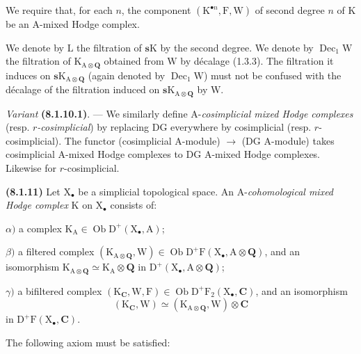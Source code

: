 \documentclass[11pt,leqno]{article}
\begin{document}
We require that, for each \(n\), the component \((\mathrm{K}^{\bullet n},\mathrm{F},\mathrm{W})\) of second degree \(n\) of \(\mathrm{K}\) be an \(\mathrm{A}\)-mixed Hodge complex.

We denote by \(\mathrm{L}\) the filtration of \(\mathbf{s}\mathrm{K}\) by the second degree. We denote by \(\operatorname{Dec}_{1}\mathrm{W}\) the filtration of \(\mathrm{K}_{\mathrm{A}\otimes\mathbf{Q}}\) obtained from \(\mathrm{W}\) by décalage (1.3.3). The filtration it induces on \(\mathbf{s}\mathrm{K}_{\mathrm{A}\otimes\mathbf{Q}}\) (again denoted by \(\operatorname{Dec}_{1}\mathrm{W}\)) must not be confused with the décalage of the filtration induced on \(\mathbf{s}\mathrm{K}_{\mathrm{A}\otimes\mathbf{Q}}\) by \(\mathrm{W}\).

\textit{Variant} \textbf{(8.1.10.1)}. — We similarly define \(\mathrm{A}\)-\textit{cosimplicial mixed Hodge complexes} (resp. \textit{\(r\)-cosimplicial}) by replacing \(\mathrm{DG}\) everywhere by cosimplicial (resp. \(r\)-cosimplicial). The functor (cosimplicial \(\mathrm{A}\)-module) \(\to\) (\(\mathrm{DG}\) \(\mathrm{A}\)-module) takes cosimplicial \(\mathrm{A}\)-mixed Hodge complexes to \(\mathrm{DG}\) \(\mathrm{A}\)-mixed Hodge complexes. Likewise for \(r\)-cosimplicial.

\textbf{(8.1.11)} Let \(\mathrm{X}_{\bullet}\) be a simplicial topological space. An \(\mathrm{A}\)-\textit{cohomological mixed Hodge complex} \(\mathrm{K}\) on \(\mathrm{X}_{\bullet}\) consists of:

\(\alpha)\) a complex \(\mathrm{K}_{\mathrm{A}}\in\operatorname{Ob}\mathrm{D}^{+}(\mathrm{X}_{\bullet},\mathrm{A})\);

\(\beta)\) a filtered complex \((\mathrm{K}_{\mathrm{A}\otimes\mathbf{Q}},\mathrm{W})\in\operatorname{Ob}\mathrm{D}^{+}\mathrm{F}(\mathrm{X}_{\bullet},\mathrm{A}\otimes\mathbf{Q})\), and an isomorphism \(\mathrm{K}_{\mathrm{A}\otimes\mathbf{Q}}\simeq\mathrm{K}_{\mathrm{A}}\otimes\mathbf{Q}\) in \(\mathrm{D}^{+}(\mathrm{X}_{\bullet},\mathrm{A}\otimes\mathbf{Q})\);

\(\gamma)\) a bifiltered complex \((\mathrm{K}_{\mathbf{C}},\mathrm{W},\mathrm{F})\in\operatorname{Ob}\mathrm{D}^{+}\mathrm{F}_{2}(\mathrm{X}_{\bullet},\mathbf{C})\), and an isomorphism
\[
(\mathrm{K}_{\mathbf{C}},\mathrm{W})
\simeq
(\mathrm{K}_{\mathrm{A}\otimes\mathbf{Q}},\mathrm{W})\otimes\mathbf{C}
\]
in \(\mathrm{D}^{+}\mathrm{F}(\mathrm{X}_{\bullet},\mathbf{C})\).

The following axiom must be satisfied:
\end{document}
